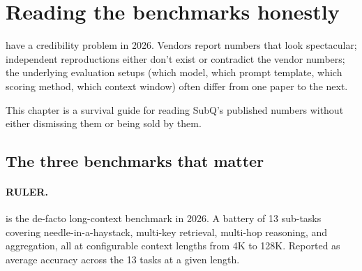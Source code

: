 \section{Reading the benchmarks honestly}
\label{ch:benchmarks}

 have a credibility problem in 2026.
Vendors report numbers that look spectacular; independent reproductions
either don't exist or contradict the vendor numbers; the underlying
evaluation setups (which model, which prompt template, which scoring
method, which context window) often differ from one paper to the next.

This chapter is a survival guide for reading SubQ's published numbers
without either dismissing them or being sold by them.

\subsection{The three benchmarks that matter}

\paragraph{RULER.} \citet{hsieh2024ruler} is the de-facto long-context
benchmark in 2026. A battery of 13 sub-tasks covering needle-in-a-haystack,
multi-key retrieval, multi-hop reasoning, and aggregation, all at
configurable context lengths from 4K to 128K. Reported as average
accuracy across the 13 tasks at a given length.

